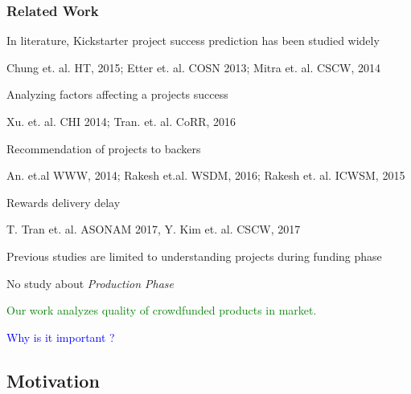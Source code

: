 \documentclass[9pt]{beamer}
\newcommand{\SubItemBlue}[1]{
	{\setlength\itemindent{15pt} \item[\color{blue}\textbullet] #1}
}
\begin{document}
\begin{frame}
	\frametitle{Related Work}
	\begin{itemize}[label=\textcolor{blue}{\textbullet}]
		\item{In literature, Kickstarter project success prediction has been studied widely}
		\SubItemBlue{\small Chung et. al. HT, 2015; Etter et. al. COSN 2013; Mitra et. al. CSCW, 2014}
		\item{ {Analyzing factors affecting a projects success}}
		\SubItemBlue{\small {Xu. et. al. CHI 2014; Tran. et. al. CoRR, 2016}}
		\item{ {Recommendation of projects to backers }}
		\SubItemBlue{\small {An. et.al WWW, 2014; Rakesh et.al. WSDM, 2016; Rakesh et. al. ICWSM, 2015}}
		\item{Rewards delivery delay}
		\SubItemBlue{\small T. Tran et. al. ASONAM 2017, Y. Kim et. al. CSCW, 2017}
		
		\item {Previous studies are limited to understanding projects during funding phase}
		\vspace{10pt}
		
	\end{itemize}
	\centering
	 No study about \textit{Production Phase}
	
	\vspace{10pt}
	\centering
	\textcolor{green} {Our work analyzes quality of crowdfunded products in market.}
	
	\vspace{10pt}
	\centering
	\textcolor{blue}{Why is it important ?}
	
\end{frame}



\subsection{Motivation}

\begin{comment}
\begin{frame}
\frametitle{Ex 1: Example of Unsuccessful Products on Amazon }
\begin{columns}
	\begin{column}{.40\textwidth} {\textbf{Jellyfish Art: Aquarium}}
		
		\begin{itemize}[label=\textcolor{blue}{\textbullet}]
			\item{\small Raised 12 times}
			\item{\small Amazon rating 2.5}
		\end{itemize}
	\end{column}		
	
	\begin{column}{.50\textwidth} 
		\texttt{[image: ./image\_2/jelly.png]}
	\end{column}				
\end{columns}
\end{frame}
\end{comment}
\end{document}
